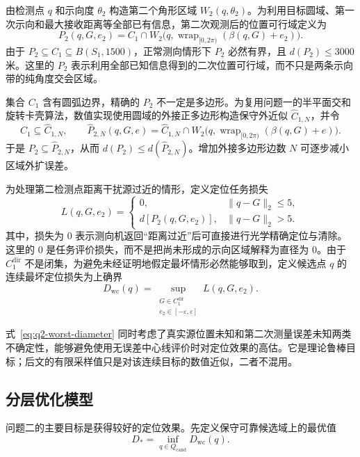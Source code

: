 由检测点 $q$ 和示向度 $\theta_2$ 构造第二个角形区域 $W_2(q,\theta_2)$。为利用目标圆域、第一次示向和最大接收距离等全部已有信息，第二次观测后的位置可行域定义为
\begin{equation}
  P_2(q,G,e_2)
  =C_1\cap W_2\bigl(q,\operatorname{wrap}_{[0,2\pi)}(\beta(q,G)+e_2)\bigr).
  \label{eq:q2-second-polygon}
\end{equation}
由于 $P_2\subseteq C_1\subseteq B(S_1,1500)$，正常测向情形下 $P_2$ 必然有界，且 $d(P_2)\leq3000$ 米。这里的 $P_2$ 表示利用全部已知信息得到的二次位置可行域，而不只是两条示向带的纯角度交会区域。

集合 $C_1$ 含有圆弧边界，精确的 $P_2$ 不一定是多边形。为复用问题一的半平面交和旋转卡壳算法，数值实现使用圆域的外接正多边形构造保守外近似 $\widehat C_{1,N}$，并令
\[
  C_1\subseteq\widehat C_{1,N},
  \qquad
  \widehat P_{2,N}(q,G,e)
  =\widehat C_{1,N}\cap
  W_2\bigl(q,\operatorname{wrap}_{[0,2\pi)}(\beta(q,G)+e)\bigr).
\]
于是 $P_2\subseteq\widehat P_{2,N}$，从而 $d(P_2)\leq d(\widehat P_{2,N})$。增加外接多边形边数 $N$ 可逐步减小区域外扩误差。

为处理第二检测点距离干扰源过近的情形，定义定位任务损失
\[
  L(q,G,e_2)=
  \begin{cases}
    0,
    & \|q-G\|_2\leq 5,\\
    d\left[P_2(q,G,e_2)\right],
    & \|q-G\|_2>5.
  \end{cases}
\]
其中，损失为 $0$ 表示测向机返回“距离过近”后可直接进行光学精确定位与清除。这里的 $0$ 是任务评价损失，而不是把尚未形成的示向区域解释为直径为 $0$。由于 $C_1^{\mathrm{dir}}$ 不是闭集，为避免未经证明地假定最坏情形必然能够取到，定义候选点 $q$ 的连续最坏定位损失为上确界
\begin{equation}
  D_{\mathrm{wc}}(q)
  =\sup_{\substack{G\in C_1^{\mathrm{dir}}\\e_2\in[-\varepsilon,\varepsilon]}}
  L(q,G,e_2).
  \label{eq:q2-worst-diameter}
\end{equation}

式~\eqref{eq:q2-worst-diameter} 同时考虑了真实源位置未知和第二次测量误差未知两类不确定性，能够避免使用无误差中心线评价时对定位效果的高估。它是理论鲁棒目标；后文的有限采样值只是对该连续目标的数值近似，二者不混用。

\subsection{分层优化模型}

问题二的主要目标是获得较好的定位效果。先定义保守可靠候选域上的最优值
\begin{equation}
  D_*=\inf_{q\in Q_{\mathrm{cand}}}D_{\mathrm{wc}}(q).
  \label{eq:q2-primary-objective}
\end{equation}

